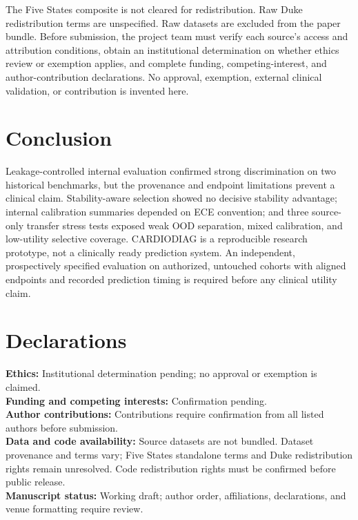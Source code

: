 \documentclass[conference]{IEEEtran}
\begin{document}
The Five States composite is not cleared for redistribution. Raw Duke redistribution terms are unspecified. Raw datasets are excluded from the paper bundle. Before submission, the project team must verify each source's access and attribution conditions, obtain an institutional determination on whether ethics review or exemption applies, and complete funding, competing-interest, and author-contribution declarations. No approval, exemption, external clinical validation, or contribution is invented here.

\section{Conclusion}
Leakage-controlled internal evaluation confirmed strong discrimination on two historical benchmarks, but the provenance and endpoint limitations prevent a clinical claim. Stability-aware selection showed no decisive stability advantage; internal calibration summaries depended on ECE convention; and three source-only transfer stress tests exposed weak OOD separation, mixed calibration, and low-utility selective coverage. CARDIODIAG is a reproducible research prototype, not a clinically ready prediction system. An independent, prospectively specified evaluation on authorized, untouched cohorts with aligned endpoints and recorded prediction timing is required before any clinical utility claim.

\section*{Declarations}
\textbf{Ethics:} Institutional determination pending; no approval or exemption is claimed.\\
\textbf{Funding and competing interests:} Confirmation pending.\\
\textbf{Author contributions:} Contributions require confirmation from all listed authors before submission.\\
\textbf{Data and code availability:} Source datasets are not bundled. Dataset provenance and terms vary; Five States standalone terms and Duke redistribution rights remain unresolved. Code redistribution rights must be confirmed before public release.\\
\textbf{Manuscript status:} Working draft; author order, affiliations, declarations, and venue formatting require review.



\end{document}
